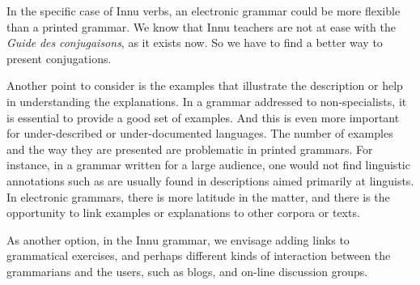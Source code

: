 \documentclass[letterpaper]{article}
\begin{document}
In the specific case of Innu verbs, an electronic grammar could be more flexible than a printed grammar. We know that Innu teachers are not at ease with the \textit{Guide }\textit{des}\textit{ }\textit{conjug}\textit{ais}\textit{ons}, as it exists now. So we have to find a better way to present conjugations.

Another point to consider is the examples that illustrate the description or help in understanding the explanations. In a grammar addressed to non-specialists, it is essential to provide a good set of examples. And this is even more important for under{}-described or under{}-documented languages. The number of examples and the way they are presented are problematic in printed grammars. For instance, in a grammar written for a large audience, one would not find linguistic annotations such as are usually found in descriptions aimed primarily at linguists. In electronic grammars, there is more latitude in the matter, and there is the opportunity to link examples or explanations to other corpora or texts.

As another option, in the Innu grammar, we envisage adding links to grammatical exercises, and  perhaps different kinds of interaction between the grammarians and the users,  such as blogs, and on-line discussion groups.
\end{document}
